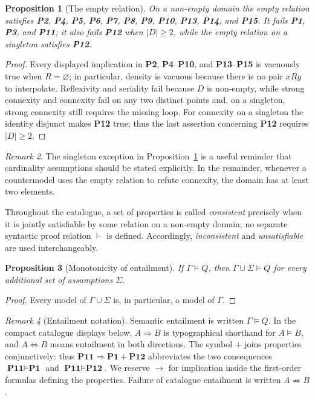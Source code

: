 \documentclass[11pt,a4paper,reqno]{amsart}
\newtheorem{proposition}{Proposition}[section]
\theoremstyle{definition}
\theoremstyle{remark}
\newtheorem{remark}[proposition]{Remark}
\newcommand{\prop}[1]{\textbf{P#1}}
\newcommand{\catentails}{\Rightarrow}
\newcommand{\catequiv}{\Longleftrightarrow}
\newcommand{\catnotentails}{\not\Rightarrow}
\begin{document}
\begin{proposition}[The empty relation]\label{prop:empty}
On a non-empty domain the empty relation satisfies \prop{2}, \prop{4}, \prop{5},
\prop{6}, \prop{7}, \prop{8}, \prop{9}, \prop{10}, \prop{13}, \prop{14}, and
\prop{15}.  It fails \prop{1}, \prop{3}, and \prop{11}; it also fails \prop{12} when $|D|\ge2$, while the empty relation on a singleton satisfies \prop{12}.
\end{proposition}
\begin{proof}
Every displayed implication in \prop{2}, \prop{4}--\prop{10}, and
\prop{13}--\prop{15} is vacuously true when $R=\varnothing$; in particular,
density is vacuous because there is no pair $xRy$ to interpolate.  Reflexivity
and seriality fail because $D$ is non-empty, while strong connexity and
connexity fail on any two distinct points and, on a singleton, strong connexity
still requires the missing loop.  For connexity on a singleton the identity
disjunct makes \prop{12} true; thus the last assertion concerning \prop{12}
requires $|D|\ge2$.
\end{proof}

\begin{remark}
The singleton exception in Proposition~\ref{prop:empty} is a useful reminder
that cardinality assumptions should be stated explicitly.  In the remainder,
whenever a countermodel uses the empty relation to refute connexity, the domain
has at least two elements.
\end{remark}

Throughout the catalogue, a set of properties is called \emph{consistent}
precisely when it is jointly satisfiable by some relation on a non-empty
domain; no separate syntactic proof relation $\vdash$ is defined.  Accordingly,
\emph{inconsistent} and \emph{unsatisfiable} are used interchangeably.

\begin{proposition}[Monotonicity of entailment]\label{prop:monotonicity}
If $\Gamma\models Q$, then $\Gamma\cup\Sigma\models Q$ for every additional set
of assumptions $\Sigma$.
\end{proposition}
\begin{proof}
Every model of $\Gamma\cup\Sigma$ is, in particular, a model of $\Gamma$.
\end{proof}

\begin{remark}[Entailment notation]\label{rem:entailment-notation}
Semantic entailment is written $\Gamma\models Q$.  In the compact catalogue
displays below, $A\catentails B$ is typographical shorthand for
$A\models B$, and $A\catequiv B$ means entailment in both directions.  The
symbol $+$ joins properties conjunctively: thus
$\prop{11}\catentails\prop{1}+\prop{12}$ abbreviates the two consequences
$\prop{11}\models\prop{1}$ and $\prop{11}\models\prop{12}$.  We reserve
$\to$ for implication inside the first-order formulas defining the
properties.  Failure of catalogue entailment is written $A\catnotentails B$.
\end{remark}
\end{document}
